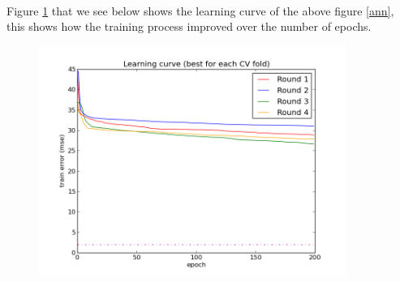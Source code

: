 \documentclass{article}
\begin{document}
\\
Figure \ref{ann2} that we see below shows the learning curve of the above figure \ref{ann}, this shows how the training process improved over the number of epochs.
\begin{figure}[!h]
\centering
\includegraphics[width=10cm, keepaspectratio=true]{pictures/ann_21_4_230.png}
\vspace{-0.4cm}
\caption{\footnotesize }
\label{ann2}
\end{figure}
\end{document}
